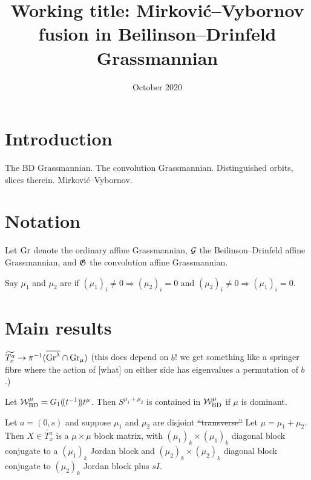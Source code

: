 \documentclass{article}
\title{Working title: Mirkovi\'c--Vybornov fusion in Beilinson--Drinfeld Grassmannian}
\date{October 2020}
\begin{document}
\maketitle

\section{Introduction}

The BD Grassmannian. The convolution Grassmannian. Distinguished orbits, slices therein. Mirkovi\'c--Vybornov.

\section{Notation}

Let $\Gr$ denote the ordinary affine Grassmannian, $\Grbd$ the Beilinson--Drinfeld affine Grassmannian, and $\Grc$ the convolution affine Grassmannian. 

\begin{definition}
    Say $\mu_1$ and $\mu_2$ are  if $(\mu_1)_i\ne 0 \Rightarrow (\mu_2)_i = 0$ and $(\mu_2)_i\ne 0 \Rightarrow (\mu_1)_i = 0$. 
\end{definition}


\section{Main results}

\begin{claim}
$\widetilde{T_x^a}\to\pi^{-1}(\overline{\Gr^\lambda}\cap\Gr_\mu)$ (this does depend on $b$! we get something like a springer fibre where the action of [what] on either side has eigenvalues a permutation of $b$.)
\end{claim}

\begin{claim}
Let $\cW^\mu_{\rm BD} = G_1\xT[t^{-1}]t^\mu$. Then $S^{\mu_1 + \mu_2}$ is contained in $\cW^\mu_{\rm BD}$ if $\mu$ is dominant.  
\end{claim}

\begin{claim}
Let $a = (0,s)$ and suppose $\mu_1$ and $\mu_2$ are disjoint \sout{``transverse''} 
Let $\mu = \mu_1 + \mu_2$. Then $X\in\widetilde{T_x^a}$ is a $\mu\times\mu$ block matrix, with $(\mu_1)_k\times(\mu_1)_k$ diagonal block conjugate to a $(\mu_1)_k$ Jordan block and $(\mu_2)_k\times (\mu_2)_k$ diagonal block conjugate to $(\mu_2)_k$ Jordan block plus $sI$.
\end{claim}
\end{document}
